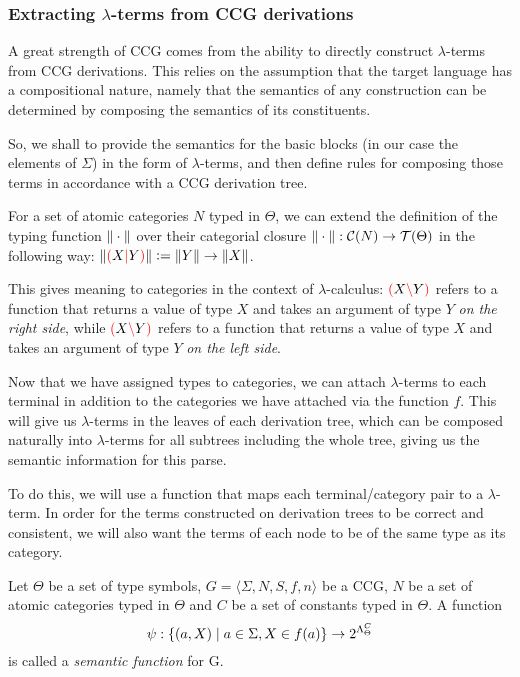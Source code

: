 \documentclass[main.tex]{subfiles}
\begin{document}
\subsubsection{Extracting $\lambda$-terms from CCG derivations}

A great strength of CCG comes from the ability to directly construct $\lambda$-terms
from CCG derivations. This relies on the assumption that the target
language has a compositional nature, namely that the semantics of any construction
can be determined by composing the semantics of its constituents.

So, we shall to provide the semantics for the basic blocks (in our case
the elements of $\Sigma$) in the form of $\lambda$-terms, and then define rules
for composing those terms in accordance with a CCG derivation tree.

\begin{defn}
    For a set of atomic categories $N$ typed in $\Theta$, we can extend the
    definition of the typing function $\|\cdot\|$ over their categorial closure
    $\|\cdot\| : \mathcal{C}( N ) \rightarrow \mathcal{T}( \Theta )$ in the following way:
    $\|\textcolor{red}{(} X \textcolor{red}{|} Y \textcolor{red}{)}\| \vcentcolon=  \|Y\| \rightarrow \|X\|$.

    This gives meaning to categories in the context of $\lambda$-calculus:
    $\textcolor{red}{(} X \textcolor{red}{\backslash} Y \textcolor{red}{)}$ refers to a function that returns a value of type
    $X$ and takes an argument of type $Y$ \emph{on the right side}, while
    $\textcolor{red}{(} X \textcolor{red}{\backslash} Y \textcolor{red}{)}$ refers to a function that returns a value of type
    $X$ and takes an argument of type $Y$ \emph{on the left side}.
\end{defn}

Now that we have assigned types to categories, we can attach $\lambda$-terms
to each terminal in addition to the categories we have attached via the function
$f$. This will give us $\lambda$-terms in the leaves of each derivation tree,
which can be composed naturally into $\lambda$-terms for all subtrees including
the whole tree, giving us the semantic information for this parse.

To do this, we will use a function that maps each terminal/category pair
to a $\lambda$-term. In order for the terms constructed on derivation trees
to be correct and consistent, we will also want the terms of each node to be
of the same type as its category.

\begin{defn}
    Let $\Theta$ be a set of type symbols,
    $ G = \langle \Sigma, N, S, f, n \rangle $ be a CCG, $N$ be
    a set of atomic categories typed in $\Theta$ and $C$ be a set
    of constants typed in $\Theta$.
    A function
    \[ \psi : \{ (a, X) \mid a \in \Sigma, X \in f(a) \} \rightarrow 2^{\Lambda^{C}_{\Theta}} \] is called a
    \emph{semantic function} for G.
\end{defn}
\end{document}
